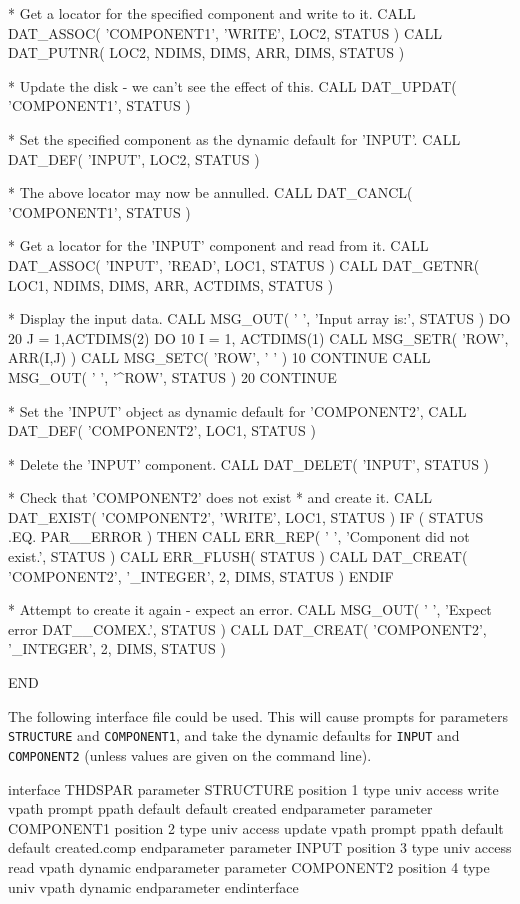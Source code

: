 \documentclass[twoside,11pt,nolof]{starlink}
\begin{document}
\begin{terminalv}
*   Get a locator for the specified component and write to it.
      CALL DAT_ASSOC( 'COMPONENT1', 'WRITE', LOC2, STATUS )
      CALL DAT_PUTNR( LOC2, NDIMS, DIMS, ARR, DIMS, STATUS )

*   Update the disk - we can't see the effect of this.
      CALL DAT_UPDAT( 'COMPONENT1', STATUS )

*   Set the specified component as the dynamic default for 'INPUT'.
      CALL DAT_DEF( 'INPUT', LOC2, STATUS )

*   The above locator may now be annulled.
      CALL DAT_CANCL( 'COMPONENT1', STATUS )

*   Get a locator for the 'INPUT' component and read from it.
      CALL DAT_ASSOC( 'INPUT', 'READ', LOC1, STATUS )
      CALL DAT_GETNR( LOC1, NDIMS, DIMS, ARR, ACTDIMS, STATUS )

*   Display the input data.
      CALL MSG_OUT( ' ', 'Input array is:', STATUS )
      DO 20 J = 1,ACTDIMS(2)
         DO 10 I = 1, ACTDIMS(1)
            CALL MSG_SETR( 'ROW', ARR(I,J) )
            CALL MSG_SETC( 'ROW', ' ' )
   10    CONTINUE
         CALL MSG_OUT( ' ', '^ROW', STATUS )
   20 CONTINUE

*   Set the 'INPUT' object as dynamic default for 'COMPONENT2',
      CALL DAT_DEF( 'COMPONENT2', LOC1, STATUS )

*   Delete the 'INPUT' component.
      CALL DAT_DELET( 'INPUT', STATUS )

*   Check that 'COMPONENT2' does not exist
*   and create it.
      CALL DAT_EXIST( 'COMPONENT2', 'WRITE', LOC1, STATUS )
      IF ( STATUS .EQ. PAR__ERROR ) THEN
         CALL ERR_REP( ' ', 'Component did not exist.', STATUS )
         CALL ERR_FLUSH( STATUS )
         CALL DAT_CREAT( 'COMPONENT2', '_INTEGER', 2, DIMS, STATUS )
      ENDIF

*   Attempt to create it again - expect an error.
      CALL MSG_OUT( ' ', 'Expect error DAT__COMEX.', STATUS )
      CALL DAT_CREAT( 'COMPONENT2', '_INTEGER', 2, DIMS, STATUS )

      END
\end{terminalv}

The following interface file could be used. This will cause prompts for
parameters \texttt{STRUCTURE} and \texttt{COMPONENT1}, and take the dynamic
defaults for \texttt{INPUT} and \texttt{COMPONENT2} (unless values are given
on the command line).
\begin{terminalv}
interface THDSPAR
 parameter STRUCTURE
   position 1
   type univ
   access write
   vpath prompt
   ppath default
   default created
 endparameter
 parameter COMPONENT1
   position 2
   type univ
   access update
   vpath prompt
   ppath default
   default created.comp
 endparameter
 parameter INPUT
   position 3
   type univ
   access read
   vpath dynamic
 endparameter
 parameter COMPONENT2
   position 4
   type univ
   vpath dynamic
 endparameter
endinterface

\end{terminalv}
\end{document}
